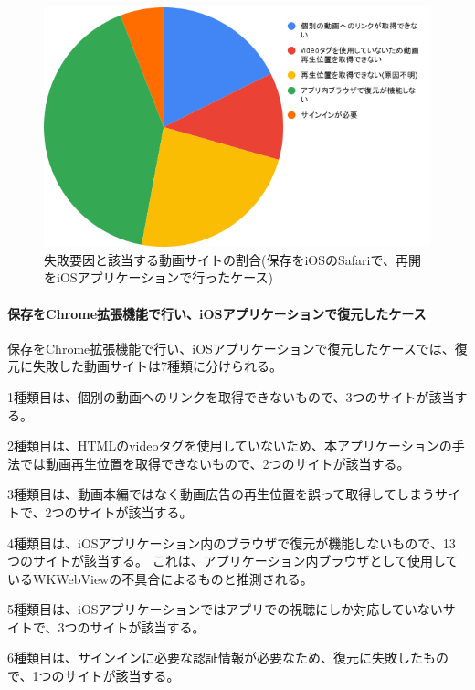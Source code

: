 \begin{figure}[htbp]
  \label{fig:evl-consideration-video-cause-ratio-ios}
  \begin{center}
    \includegraphics[bb=0 0 600 371,width=15cm]{img/060_evaluation/consideration/video/cause-ratio-ios.pdf}
  \end{center}
  \caption{失敗要因と該当する動画サイトの割合(保存をiOSのSafariで、再開をiOSアプリケーションで行ったケース)}
\end{figure}

\paragraph{保存をChrome拡張機能で行い、iOSアプリケーションで復元したケース}
保存をChrome拡張機能で行い、iOSアプリケーションで復元したケースでは、復元に失敗した動画サイトは7種類に分けられる。

1種類目は、個別の動画へのリンクを取得できないもので、3つのサイトが該当する。

2種類目は、HTMLのvideoタグを使用していないため、本アプリケーションの手法では動画再生位置を取得できないもので、2つのサイトが該当する。

3種類目は、動画本編ではなく動画広告の再生位置を誤って取得してしまうサイトで、2つのサイトが該当する。

4種類目は、iOSアプリケーション内のブラウザで復元が機能しないもので、13つのサイトが該当する。
これは、アプリケーション内ブラウザとして使用しているWKWebViewの不具合によるものと推測される。

5種類目は、iOSアプリケーションではアプリでの視聴にしか対応していないサイトで、3つのサイトが該当する。

6種類目は、サインインに必要な認証情報が必要なため、復元に失敗したもので、1つのサイトが該当する。

